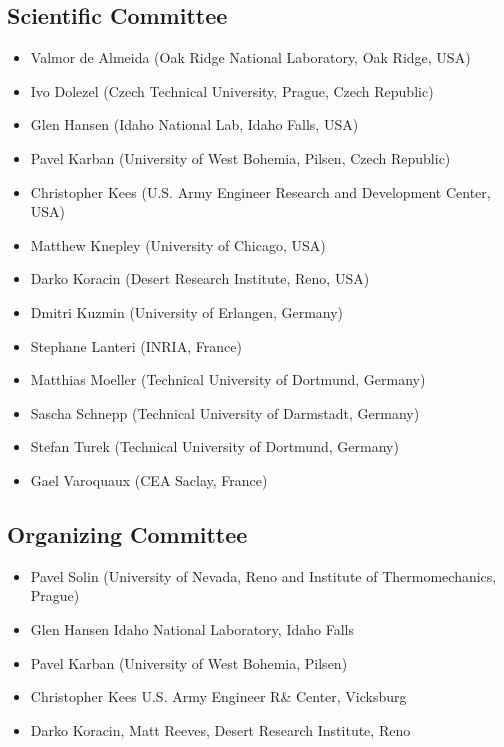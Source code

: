 \documentclass[article,A4,11pt]{llncs}
\begin{document}
\subsection*{Scientific Committee}

\begin{itemize}
\item Valmor de Almeida (Oak Ridge National Laboratory, Oak Ridge, USA)
\item Ivo Dolezel (Czech Technical University, Prague, Czech Republic)
\item Glen Hansen (Idaho National Lab, Idaho Falls, USA)
\item Pavel Karban (University of West Bohemia, Pilsen, Czech Republic)
\item Christopher Kees (U.S. Army Engineer Research and Development Center, USA)
\item Matthew Knepley (University of Chicago, USA)
\item Darko Koracin (Desert Research Institute, Reno, USA)
\item Dmitri Kuzmin (University of Erlangen, Germany)
\item Stephane Lanteri (INRIA, France)
\item Matthias Moeller (Technical University of Dortmund, Germany)
\item Sascha Schnepp (Technical University of Darmstadt, Germany)
\item Stefan Turek (Technical University of Dortmund, Germany)
\item Gael Varoquaux (CEA Saclay, France)
\end{itemize}

\subsection*{Organizing Committee}

\begin{itemize}
\item Pavel Solin (University of Nevada, Reno and Institute of Thermomechanics, Prague)
\item Glen Hansen Idaho National Laboratory, Idaho Falls
\item Pavel Karban  (University of West Bohemia, Pilsen)
\item Christopher Kees U.S. Army Engineer R\& Center, Vicksburg
\item Darko Koracin, Matt Reeves, Desert Research Institute, Reno
\end{itemize}
\end{document}
